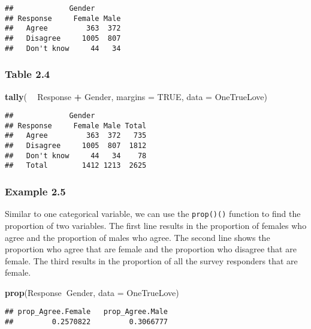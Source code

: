 \documentclass[]{book}
\newenvironment{Shaded}{\begin{snugshade}}{\end{snugshade}}
\newcommand{\DataTypeTok}[1]{\textcolor[rgb]{0.13,0.29,0.53}{#1}}
\newcommand{\KeywordTok}[1]{\textcolor[rgb]{0.13,0.29,0.53}{\textbf{#1}}}
\newcommand{\NormalTok}[1]{#1}
\newcommand{\OperatorTok}[1]{\textcolor[rgb]{0.81,0.36,0.00}{\textbf{#1}}}
\newcommand{\OtherTok}[1]{\textcolor[rgb]{0.56,0.35,0.01}{#1}}
\newcommand{\StringTok}[1]{\textcolor[rgb]{0.31,0.60,0.02}{#1}}
\begin{document}
\begin{verbatim}
##             Gender
## Response     Female Male
##   Agree         363  372
##   Disagree     1005  807
##   Don't know     44   34
\end{verbatim}

\hypertarget{table-2.4}{%
\subsubsection{Table 2.4}\label{table-2.4}}

\begin{Shaded}
\begin{Highlighting}[]
\KeywordTok{tally}\NormalTok{( }\OperatorTok{~}\StringTok{ }\NormalTok{Response }\OperatorTok{+}\StringTok{ }\NormalTok{Gender, }\DataTypeTok{margins =} \OtherTok{TRUE}\NormalTok{, }\DataTypeTok{data =}\NormalTok{ OneTrueLove)}
\end{Highlighting}
\end{Shaded}

\begin{verbatim}
##             Gender
## Response     Female Male Total
##   Agree         363  372   735
##   Disagree     1005  807  1812
##   Don't know     44   34    78
##   Total        1412 1213  2625
\end{verbatim}

\hypertarget{example-2.5}{%
\subsubsection{Example 2.5}\label{example-2.5}}

Similar to one categorical variable, we can use the \texttt{prop()()} function to find the proportion of two variables. The first line results in the proportion of females who agree and the proportion of males who agree. The second line shows the proportion who agree that are female and the proportion who disagree that are female. The third results in the proportion of all the survey responders that are female.

\begin{Shaded}
\begin{Highlighting}[]
\KeywordTok{prop}\NormalTok{(Response}\OperatorTok{~}\NormalTok{Gender, }\DataTypeTok{data =}\NormalTok{ OneTrueLove)}
\end{Highlighting}
\end{Shaded}

\begin{verbatim}
## prop_Agree.Female   prop_Agree.Male 
##         0.2570822         0.3066777
\end{verbatim}
\end{document}
